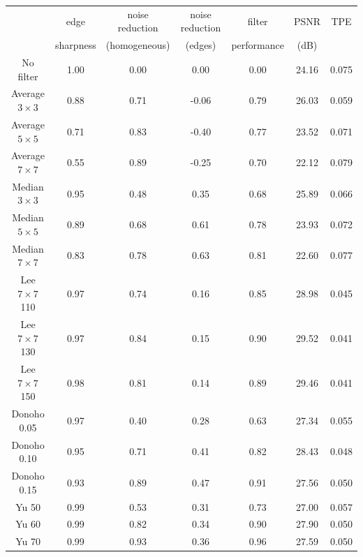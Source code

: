 \documentclass[12pt]{report}
\renewcommand{\baselinestretch}{1.5}
\begin{document}
\begin{table}[p]
\setlength{\abovecaptionskip}{-0.25cm}
\renewcommand{\baselinestretch}{1}
\begin{center}
\begin{scriptsize}
\begin{tabular}{|c|c|c|c|c|c|c|} \hline
			& edge		& noise reduction & noise reduction 	& filter& PSNR 		& TPE	\\
			& sharpness	& (homogeneous)	  & (edges)		& performance & (dB)	&	\\ \hline \hline
No filter		& 1.00	& 0.00		& 0.00		& 0.00	& 24.16		& 0.075		\\ \hline \hline

Average $3 \times 3$	& 0.88	& 0.71		& -0.06		& 0.79	& 26.03		& 0.059		\\ \hline	
Average $5 \times 5$	& 0.71	& 0.83		& -0.40		& 0.77	& 23.52		& 0.071		\\ \hline	
Average $7 \times 7$	& 0.55	& 0.89		& -0.25		& 0.70	& 22.12		& 0.079		\\ \hline \hline

Median $3 \times 3$	& 0.95	& 0.48		& 0.35		& 0.68	& 25.89		& 0.066		\\ \hline		
Median $5 \times 5$	& 0.89	& 0.68		& 0.61		& 0.78	& 23.93		& 0.072		\\ \hline	
Median $7 \times 7$	& 0.83	& 0.78		& 0.63		& 0.81	& 22.60		& 0.077		\\ \hline \hline	

Lee $7 \times 7$ 110	& 0.97	& 0.74		& 0.16		& 0.85	& 28.98 	& 0.045		\\ \hline
Lee $7 \times 7$ 130	& 0.97	& 0.84		& 0.15		& 0.90	& 29.52		& 0.041		\\ \hline
Lee $7 \times 7$ 150 	& 0.98	& 0.81		& 0.14		& 0.89	& 29.46		& 0.041		\\ \hline \hline

Donoho 0.05		& 0.97	& 0.40		& 0.28		& 0.63 	& 27.34		& 0.055		\\ \hline
Donoho 0.10		& 0.95	& 0.71		& 0.41		& 0.82	& 28.43		& 0.048		\\ \hline
Donoho 0.15		& 0.93	& 0.89		& 0.47		& 0.91	& 27.56		& 0.050 	\\ \hline \hline

Yu 50			& 0.99	& 0.53		& 0.31		& 0.73	& 27.00		& 0.057		\\ \hline
Yu 60			& 0.99  & 0.82		& 0.34		& 0.90	& 27.90		& 0.050		\\ \hline
Yu 70 			& 0.99	& 0.93		& 0.36		& 0.96	& 27.59		& 0.050		\\ \hline \hline


\end{tabular}
\end{scriptsize}
\end{center}
\end{table}
\end{document}
